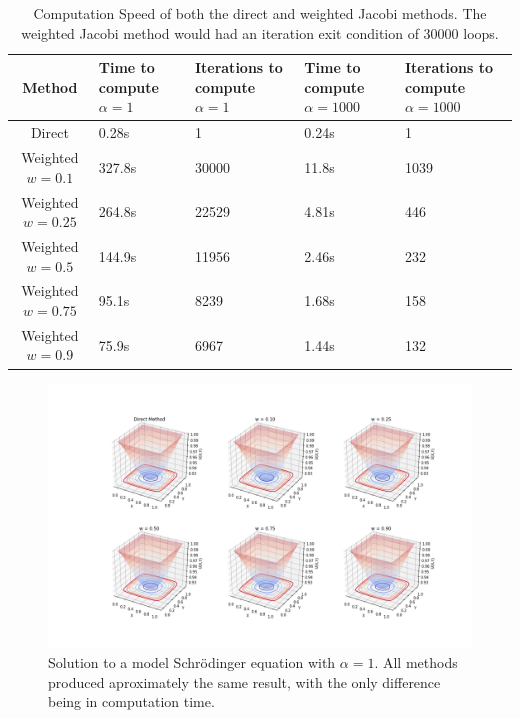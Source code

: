 \documentclass[twocolumn]{article}
\begin{document}
\begin{table}
	\begin{center}
\begin{tabular}{|c|p{2cm}|p{2cm}|p{2cm}|p{2cm}|}
	\hline  Method& Time to compute $\alpha=1$ & Iterations to compute $\alpha=1$ & Time to compute $\alpha=1000$ & Iterations to compute $\alpha = 1000$ \\ 
	\hline
	Direct & 0.28s & 1  & 0.24s & 1 \\ 
	\hline
	Weighted $w=0.1$  & 327.8s & 30000 & 11.8s & 1039 \\ 
	\hline
	Weighted $w=0.25$  & 264.8s  & 22529 & 4.81s & 446\\ 
	\hline
	Weighted $w=0.5$  & 144.9s & 11956 & 2.46s & 232 \\ 
	\hline
	Weighted $w=0.75$  & 95.1s & 8239 & 1.68s & 158 \\ 
	\hline
	Weighted $w=0.9$  & 75.9s & 6967 & 1.44s & 132\\ 
	\hline 
\end{tabular} 
\caption{Computation Speed of both the direct and weighted Jacobi methods. The weighted Jacobi method would had an iteration exit condition of $30000$ loops.}
\label{Jacobi compare}
	\end{center}
\end{table}

\begin{figure}
\centering
\includegraphics[width=\textwidth]{schroe_alpha_1}
\caption{Solution to a model Schr\"{o}dinger equation with $\alpha=1$. All methods produced aproximately the same result, with the only difference being in computation time.}
\label{fig:schroe_alpha_1}
\end{figure}
\end{document}
